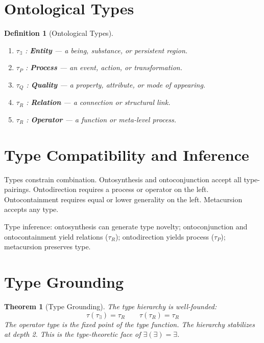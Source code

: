 \documentclass[12pt, letterpaper]{book}
\def\equiv{=}%
\def\circlearrowleft{R}%
\newtheorem{theorem}{Theorem}[chapter]
\newtheorem{definition}{Definition}[chapter]
\newcommand{\E}{\exists}                          %
\newcommand{\EE}{\exists(\exists)}                 %
\begin{document}
\section{Ontological Types}

\begin{definition}[Ontological Types]
\begin{enumerate}[label=(\roman*)]
    \item $\tau_\E$ : \textbf{Entity} --- a being, substance, or persistent region.
    \item $\tau_P$ : \textbf{Process} --- an event, action, or transformation.
    \item $\tau_Q$ : \textbf{Quality} --- a property, attribute, or mode of appearing.
    \item $\tau_R$ : \textbf{Relation} --- a connection or structural link.
    \item $\tau_\circlearrowleft$ : \textbf{Operator} --- a function or meta-level process.
\end{enumerate}
\end{definition}

\section{Type Compatibility and Inference}

Types constrain combination. Ontosynthesis and ontoconjunction accept all type-pairings. Ontodirection requires a process or operator on the left. Ontocontainment requires equal or lower generality on the left. Metacursion accepts any type.

Type inference: ontosynthesis can generate type novelty; ontoconjunction and ontocontainment yield relations ($\tau_R$); ontodirection yields process ($\tau_P$); metacursion preserves type.

\section{Type Grounding}

\begin{theorem}[Type Grounding]
The type hierarchy is well-founded:
\[
\tau(\tau_\E) \equiv \tau_\circlearrowleft \qquad \tau(\tau_\circlearrowleft) \equiv \tau_\circlearrowleft
\]
The operator type is the fixed point of the type function. The hierarchy stabilizes at depth 2. This is the type-theoretic face of $\EE \equiv \E$.
\end{theorem}
\end{document}
